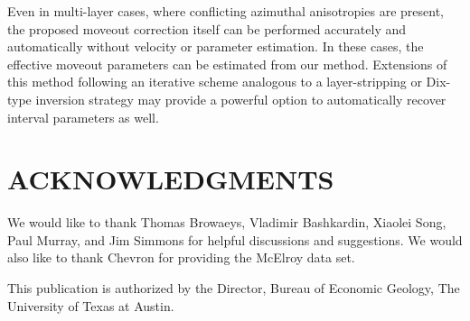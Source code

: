 Even in multi-layer cases, where conflicting azimuthal anisotropies are present, the proposed moveout correction itself can be performed accurately and automatically without velocity or parameter estimation.  In these cases, the effective moveout parameters can be estimated from our method.  Extensions of this method following an iterative scheme analogous to a layer-stripping or Dix-type inversion strategy may provide a powerful option to automatically recover interval parameters as well.


\section{ACKNOWLEDGMENTS}
We would like to thank Thomas Browaeys, Vladimir Bashk\-ardin, Xiaolei Song, Paul Murray, and Jim Simmons for helpful discussions and suggestions. We would also like to thank Chevron for providing the McElroy data set.

This publication is authorized by the Director, Bureau of Economic
Geology, The University of Texas at Austin.



